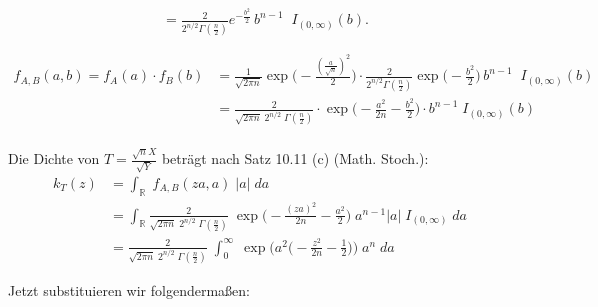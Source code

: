 \documentclass[a4paper]{article}
\begin{document}
\begin{description}
{\begin{equation*}
\begin{split}
			\\&= \frac{2}{2^{n/2} \Gamma(\frac{n}{2})} e^{-\frac{b^2}{2}} \,b^{n-1} \;  \;I_{(0,\infty)}(b).\\\\ 
			\end{split}\end{equation*} 
					\begin{equation*}\begin{split}
							f_{A,B} (a,b) = f_A(a) \cdot f_B(b) &= \frac{1}{\sqrt{2\pi n}} \exp\Big(-\frac{(\frac{a}{\sqrt{n}})^2}{2}\Big) \cdot \frac{2}{2^{n/2} \Gamma(\frac{n}{2})} \exp\Big(-\frac{b^2}{2}\Big) \,b^{n-1} \;  \;I_{(0,\infty)}(b)
							\\&= \frac{2}{\sqrt{2\pi n}\;2^{n/2}\; \Gamma(\frac{n}{2})} \cdot \exp\Big(-\frac{a^2}{2n}-\frac{b^2}{2}\Big) \cdot b^{n-1} \;I_{(0,\infty)}(b)
					\end{split}\end{equation*} \\ Die Dichte von $T = \frac{\sqrt{n}X}{\sqrt{Y}}$ beträgt nach Satz 10.11 (c) (Math. Stoch.):
			\begin{equation*}\begin{split}
				k_T(z) &= \int_{\mathbb{R}} \; f_{A,B} (za,a)\;|a|\; da 
					 \\&= \int_{\mathbb{R}} \frac{2}{\sqrt{2\pi n} \; 2^{n/2}\; \Gamma(\frac{n}{2})} \; \exp\Big(-\frac{(za)^2}{2n} -\frac{a^2}{2}  \Big) \; a^{n-1} |a| \; I_{(0,\infty)}\; da 
					\\&= \frac{2}{\sqrt{2\pi n} \; 2^{n/2}\; \Gamma(\frac{n}{2})} \; \int_0^\infty \; \exp\Big(a^2\big(-\frac{z^2}{2n} -\frac{1}{2}\big) \Big)\; a^n \; da
			\end{split}\end{equation*}
			}
	\end{description}

Jetzt substituieren wir folgendermaßen:
\end{document}
